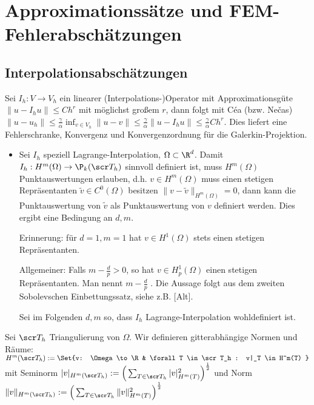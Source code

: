 \section{Approximationssätze und FEM-Fehlerabschätzungen} \label{sec:3.5}


\subsection*{Interpolationsabschätzungen}

Sei $I_h: V \to V_h$ ein linearer (Interpolations-)Operator mit Approximationsgüte $\|u - I_h u\| \le C h^r$ mit möglichst großem $r$, dann folgt mit Céa (bzw. Nečas)
\begin{math}
	\|u - u_h\| \le \frac{\gamma}{\alpha} \inf_{v\in V_h} \|u - v\|
	\le \frac{\gamma}{\alpha} \|u - I_h u\|
	\le \frac{\gamma}{\alpha} C h^r.
\end{math}
Dies liefert eine Fehlerschranke, Konvergenz und Konvergenzordnung für die Galerkin-Projektion.

\begin{itemize}
	\item
		Sei $I_h$ speziell Lagrange-Interpolation, $\Omega \subset \R^d$.
		Damit $I_h: H^m(\Omega) \to \P_k(\scr T_h)$ sinnvoll definiert ist, muss $H^m(\Omega)$ Punktauswertungen erlauben, d.h. $v \in H^m(\Omega)$ muss einen stetigen Repräsentanten $\tilde v \in C^0(\Omega)$ besitzen $\|v - \tilde v\|_{H^m(\Omega)} = 0$, dann kann die Punktauswertung von $\tilde v$ als Punktauswertung von $v$ definiert werden.
		Dies ergibt eine Bedingung an $d, m$.

		Erinnerung: für $d = 1, m = 1$ hat $v \in H^1(\Omega)$ stets einen stetigen Repräsentanten.

		Allgemeiner: Falls $m - \frac{d}{p} > 0$, so hat $v \in H_p^1(\Omega)$ einen stetigen Repräsentanten.
		Man nennt $m - \frac{d}{p}$ .
		Die Aussage folgt aus dem zweiten Sobolevschen Einbettungssatz, siehe z.B. [Alt].

		Sei im Folgenden $d,m$ so, dass $I_h$ Lagrange-Interpolation wohldefiniert ist.
\end{itemize}



\begin{df} \label{3.75}
	Sei $\scr T_h$ Triangulierung von $\Omega$.
	Wir definieren gitterabhängige Normen und Räume:
	\begin{math}
		H^m(\scr T_h) := \Set{v: \Omega \to \R & \forall T \in \scr T_h : v|_T \in H^m(T) }
	\end{math}
	mit Seminorm
	\begin{math}
		|v|_{H^m(\scr T_h)} := \Big( \sum_{T\in \scr T_h} |v|_{H^m(T)}^2 \Big)^{\frac{1}{2}}
	\end{math}
	und Norm
	\begin{math}
		\|v\|_{H^m(\scr T_h)} := \Big( \sum_{T\in \scr T_h} \|v\|_{H^m(T)}^2 \Big)^{\frac{1}{2}}
	\end{math}
\end{df}

